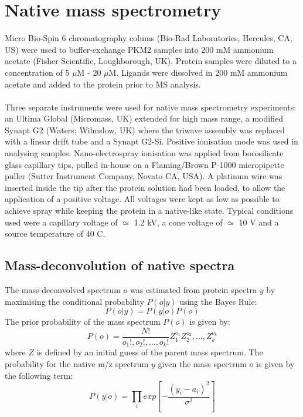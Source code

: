 \section{Native mass spectrometry}
Micro Bio-Spin 6 chromatography colums (Bio-Rad Laboratories, Hercules, CA, US) were used to buffer-exchange PKM2 samples into 200 mM ammonium acetate (Fisher Scientific, Loughborough, UK). Protein samples were diluted to a concentration of 5 $\mu$M - 20 $\mu$M. Ligands were dissolved in 200 mM ammonium acetate and added to the protein prior to MS analysis.
%
%
\\\\
%
%
Three separate instruments were used for native mass spectrometry experiments: an Ultima Global (Micromass, UK) extended for high mass range, a modified Synapt G2 (Waters; Wilmslow, UK) where the triwave assembly was replaced with a linear drift tube and a Synapt G2-Si. Positive ionisation mode was used in analysing samples. Nano-electrospray ionisation was applied from borosilicate glass capillary tips, pulled in-house on a Flaming/Brown P-1000 micropipette puller (Sutter Instrument Company, Novato CA, USA). A platinum wire was inserted inside the tip after the protein solution had been loaded, to allow the application of a positive voltage. All voltages were kept as low as possible to achieve spray while keeping the protein in a native-like state. Typical conditions used were a capillary voltage of $\simeq$ 1.2 kV, a cone voltage of $\simeq$ 10 V and a source temperature of 40 \textdegree C. 

\subsection{Mass-deconvolution of native spectra}
\label{methods:mass_deconv_ms}
The mass-deconvolved spectrum $o$ was estimated from protein spectra $y$ by maximising the conditional probability $P(o|y)$ using the Bayes Rule:
%
%
\begin{equation}
P(o|y) = P(y|o)P(o)
\end{equation}
%
%
The prior probability of the mass spectrum $P(o)$ is given by:
%
%
\begin{equation}
P(o) = \frac{N!}{o_{1}!, o_{2}!, ..., o_{k}!} Z^{o_{1}}_{1} Z^{o_{2}}_{2}, ..., Z^{o_{k}}_{k}
\end{equation}
%
%
where $Z$ is defined by an initial guess of the parent mass spectrum. The probability for the native m/z spectrum $y$ given the mass spectrum $o$ is given by the following term:
%
\begin{equation}
P(y|o) = \prod_{i} exp \left[ - \frac{(y_{i} - a_{i})^{2} }{ \sigma ^{2} } \right]
\label{equ:pyo_maxent}
\end{equation}
%
%

